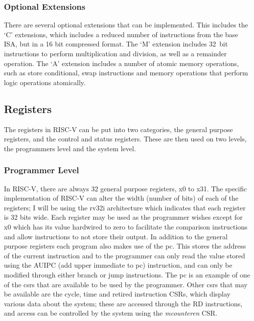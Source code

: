 \subsubsection{Optional Extensions}
There are several optional extensions that can be implemented. This includes the `C' extensions, which includes a reduced number of instructions from the base ISA, but in a 16 bit compressed format. The `M' extension includes 32~bit instructions to perform multiplication and division, as well as a remainder operation. The `A' extension includes a number of atomic memory operations, such as store conditional, swap instructions and memory operations that perform logic operations atomically.
\subsection{Registers}
The registers in RISC-V can be put into two categories, the general purpose registers, and the control and status registers. These are then used on two levels, the programmers level and the system level.
\subsubsection{Programmer Level}
In RISC-V, there are always 32 general purpose registers, x0 to x31. The specific implementation of RISC-V can alter the width (number of bits) of each of the registers; I will be using the rv32i architecture which indicates that each register is 32 bits wide. Each register may be used as the programmer wishes except for x0 which has its value hardwired to zero to facilitate the comparison instructions and allow instructions to not store their output. In addition to the general purpose registers each program also makes use of the \ac{pc}. This stores the address of the current instruction and to the programmer can only read the value stored using the AUIPC (add upper immediate to pc) instruction, and can only be modified through either branch or jump instructions. The pc is an example of one of the  \ac{csrs} that are available to be used by the programmer. Other \ac{csrs} that may be available are the cycle, time and retired instruction CSRs, which display various data about the system; these are accessed through the RD instructions, and access can be controlled by the system using the \textit{mcounteren} CSR.
